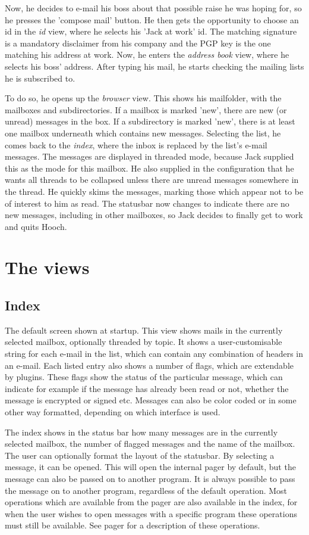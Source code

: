 \documentclass[a4paper]{book}
\begin{document}
Now, he decides to e-mail his boss about that possible raise he was hoping
for, so he presses the 'compose mail' button. He then gets the opportunity to
choose an id in the \emph{id} view, where he selects his 'Jack at work' id.
The matching signature is a mandatory disclaimer from his company and the PGP
key is the one matching his address at work. Now, he enters the
\emph{address book} view, where he selects his boss' address. After typing
his mail, he starts checking the mailing lists he is subscribed to.

To do so, he opens up the \emph{browser} view. This shows his mailfolder,
with the mailboxes and subdirectories. If a mailbox is marked 'new', there
are new (or unread) messages in the box. If a subdirectory is marked 'new',
there is at least one mailbox underneath which contains new messages.
Selecting the list, he comes back to the \emph{index}, where the inbox is
replaced by the list's e-mail messages. The messages are displayed in
threaded mode, because Jack supplied this as the mode for this mailbox.
He also supplied in the configuration that he wants all threads to be
collapsed unless there are unread messages somewhere in the thread.
He quickly skims the messages, marking those which appear not to be of
interest to him as read. The statusbar now changes to indicate there are no
new messages, including in other mailboxes, so Jack decides to finally get
to work and quits Hooch.


\chapter{The views}

\section{Index}

The default screen shown at startup. This view shows mails in the currently
selected mailbox, optionally threaded by topic. It shows a user-customisable
string for each e-mail in the list, which can contain any combination of
headers in an e-mail. Each listed entry also shows a number of flags, which
are extendable by plugins. These flags show the status of the particular
message, which can indicate for example if the message has already been read
or not, whether the message is encrypted or signed etc.
Messages can also be color coded or in some other way formatted, depending on
which interface is used. 

The index shows in the status bar how many messages are in the currently
selected mailbox, the number of flagged messages and the name of the mailbox.
The user can optionally format the layout of the statusbar.
By selecting a message, it can be opened. This will open the internal pager by
default, but the message can also be passed on to another program. It is
always possible to pass the message on to another program, regardless of the
default operation.
Most operations which are available from the pager are also available in the
index, for when the user wishes to open messages with a specific program
these operations must still be available. See pager for a description of these
operations.
\end{document}
